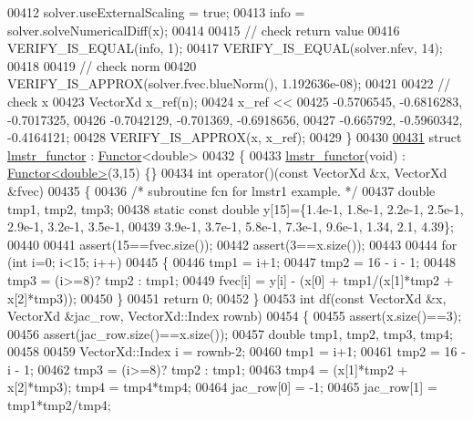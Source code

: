 \begin{DoxyCode}
00412   solver.useExternalScaling = \textcolor{keyword}{true};
00413   info = solver.solveNumericalDiff(x);
00414 
00415   \textcolor{comment}{// check return value}
00416   VERIFY\_IS\_EQUAL(info, 1);
00417   VERIFY\_IS\_EQUAL(solver.nfev, 14);
00418 
00419   \textcolor{comment}{// check norm}
00420   VERIFY\_IS\_APPROX(solver.fvec.blueNorm(), 1.192636e-08);
00421 
00422   \textcolor{comment}{// check x}
00423   VectorXd x\_ref(n);
00424   x\_ref <<
00425       -0.5706545,    -0.6816283,    -0.7017325,
00426       -0.7042129,     -0.701369,    -0.6918656,
00427       -0.665792,    -0.5960342,    -0.4164121;
00428   VERIFY\_IS\_APPROX(x, x\_ref);
00429 \}
00430 
\hyperlink{structlmstr__functor}{00431} \textcolor{keyword}{struct }\hyperlink{structlmstr__functor}{lmstr\_functor} : \hyperlink{struct_functor}{Functor}<double>
00432 \{
00433     \hyperlink{structlmstr__functor}{lmstr\_functor}(\textcolor{keywordtype}{void}) : \hyperlink{struct_functor}{Functor<double>}(3,15) \{\}
00434     \textcolor{keywordtype}{int} operator()(\textcolor{keyword}{const} VectorXd &x, VectorXd &fvec)
00435     \{
00436         \textcolor{comment}{/*  subroutine fcn for lmstr1 example. */}
00437         \textcolor{keywordtype}{double} tmp1, tmp2, tmp3;
00438         \textcolor{keyword}{static} \textcolor{keyword}{const} \textcolor{keywordtype}{double} y[15]=\{1.4e-1, 1.8e-1, 2.2e-1, 2.5e-1, 2.9e-1, 3.2e-1, 3.5e-1,
00439             3.9e-1, 3.7e-1, 5.8e-1, 7.3e-1, 9.6e-1, 1.34, 2.1, 4.39\};
00440 
00441         assert(15==fvec.size());
00442         assert(3==x.size());
00443 
00444         \textcolor{keywordflow}{for} (\textcolor{keywordtype}{int} i=0; i<15; i++)
00445         \{
00446             tmp1 = i+1;
00447             tmp2 = 16 - i - 1;
00448             tmp3 = (i>=8)? tmp2 : tmp1;
00449             fvec[i] = y[i] - (x[0] + tmp1/(x[1]*tmp2 + x[2]*tmp3));
00450         \}
00451         \textcolor{keywordflow}{return} 0;
00452     \}
00453     \textcolor{keywordtype}{int} df(\textcolor{keyword}{const} VectorXd &x, VectorXd &jac\_row, VectorXd::Index rownb)
00454     \{
00455         assert(x.size()==3);
00456         assert(jac\_row.size()==x.size());
00457         \textcolor{keywordtype}{double} tmp1, tmp2, tmp3, tmp4;
00458 
00459         VectorXd::Index i = rownb-2;
00460         tmp1 = i+1;
00461         tmp2 = 16 - i - 1;
00462         tmp3 = (i>=8)? tmp2 : tmp1;
00463         tmp4 = (x[1]*tmp2 + x[2]*tmp3); tmp4 = tmp4*tmp4;
00464         jac\_row[0] = -1;
00465         jac\_row[1] = tmp1*tmp2/tmp4;

\end{DoxyCode}
